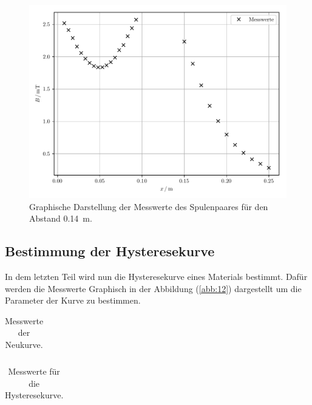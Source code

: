 \begin{figure}[H]
  \centering
  \includegraphics{plot5.pdf}
  \caption{Graphische Darstellung der Messwerte des Spulenpaares für den Abstand \SI{0.14}{\meter}.}
  \label{abb:11}
\end{figure}

\subsection{Bestimmung der Hysteresekurve}

In dem letzten Teil wird nun die Hysteresekurve eines Materials bestimmt. Dafür werden
die Messwerte Graphisch in der Abbildung (\ref{abb:12}) dargestellt um die Parameter
der Kurve zu bestimmen.

\begin{table}[H]
  \centering
  \caption{Messwerte der Neukurve.}
  \label{tab:6}
  \begin{tabular}{c c}
    \toprule
    \midrule
    \bottomrule
  \end{tabular}
\end{table}

\begin{table}[H]
  \centering
  \caption{Messwerte für die Hysteresekurve.}
  \label{tab:7}
  \begin{tabular}{c c}
    \toprule
    \midrule
    \bottomrule
  \end{tabular}
\end{table}


